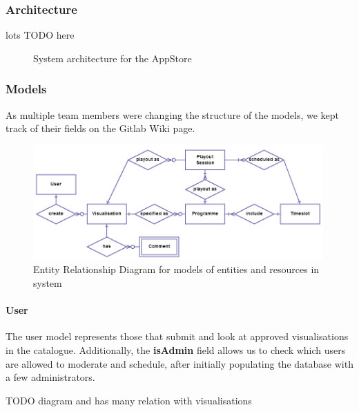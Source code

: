 \documentclass[a4paper, titlepage]{article}
\begin{document}
\subsubsection{Architecture} 
lots TODO here

\begin{figure}[h!]
  \centering
  \caption{System architecture for the AppStore}
  \label{fig:impl_models}
\end{figure}


\subsubsection{Models}
As multiple team members were changing the structure of the models, we kept track of their fields
on the Gitlab Wiki page. 

\begin{figure}[h!]
  \centering
    \includegraphics[width = 0.99\textwidth]{./impl/models.png}
  \caption{Entity Relationship Diagram for models of entities and resources in system}
  \label{fig:impl_models}
\end{figure}


\paragraph{User}
The user model represents those that submit and look at approved visualisations in the catalogue. 
Additionally, the \textbf{isAdmin} field allows us to check which users are allowed to moderate 
and schedule, after initially populating the database with a few administrators. 

TODO diagram and has many relation with visualisations
\end{document}
